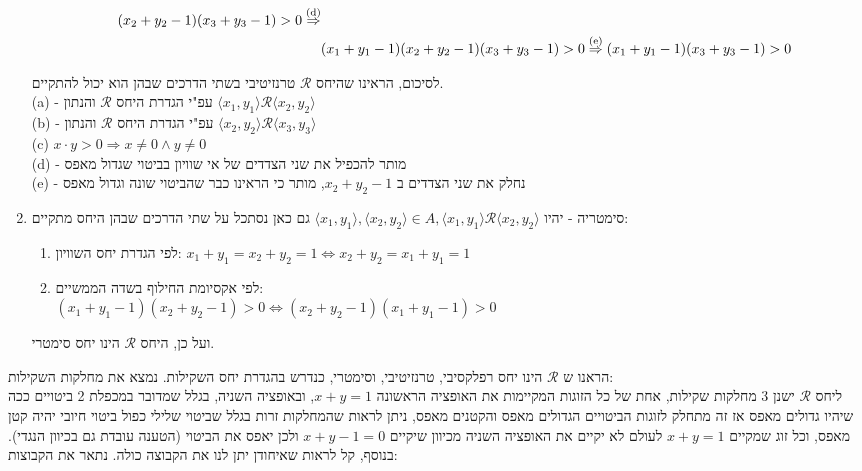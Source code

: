 \documentclass{article}
\begin{document}
\begin{enumerate}
\begin{enumerate}
\begin{align*}
				(x_2 + y_2 - 1)(x_3 + y_3 - 1) > 0 \overset{\text{(d)}}\Rightarrow \\
				&(x_1 + y_1 - 1)(x_2 + y_2 - 1)(x_3 + y_3 - 1) > 0 \overset{\text{(e)}}\Rightarrow
				(x_1 + y_1 - 1)(x_3 + y_3 - 1) > 0
			\end{align*}
		\end{enumerate}
		לסיכום, הראינו שהיחס $\mathcal{R}$ טרנזיטיבי בשתי הדרכים שבהן הוא יכול להתקיים. \\
		(a) - עפ"י הגדרת היחס $\mathcal{R}$ והנתון $\langle x_1, y_1 \rangle \mathcal{R} \langle x_2, y_2 \rangle$ \\
		(b) - עפ"י הגדרת היחס $\mathcal{R}$ והנתון $\langle x_2, y_2 \rangle \mathcal{R} \langle x_3, y_3 \rangle$ \\
		(c) $x \cdot y > 0 \Rightarrow x \neq 0 \land y \neq 0$ \\
		(d) - מותר להכפיל את שני הצדדים של אי שוויון בביטוי שגדול מאפס\\
		(e) - נחלק את שני הצדדים ב $x_2 + y_2 - 1$, מותר כי הראינו כבר שהביטוי שונה וגדול מאפס

	\item סימטריה -
	יהיו $\langle x_1, y_1 \rangle, \langle x_2, y_2 \rangle \in A,
	\langle x_1, y_1 \rangle \mathcal{R} \langle x_2, y_2 \rangle$
	גם כאן נסתכל על שתי הדרכים שבהן היחס מתקיים:
	\begin{enumerate}
		\item לפי הגדרת יחס השוויון: $x_1 + y_1 = x_2 + y_2 = 1 \iff x_2 + y_2 = x_1 + y_1 = 1$
		\item לפי אקסיומת החילוף בשדה הממשיים:  \\
		$(x_1 + y_1 - 1)(x_2 + y_2 - 1) > 0 \iff (x_2 + y_2 - 1)(x_1 + y_1 - 1) > 0$
	\end{enumerate}
	ועל כן, היחס $\mathcal{R}$ הינו יחס סימטרי.
\end{enumerate}
הראנו ש $\mathcal{R}$ הינו יחס רפלקסיבי, טרנזיטיבי, וסימטרי, כנדרש בהגדרת יחס השקילות.
נמצא את מחלקות השקילות: \\
ליחס $\mathcal{R}$ ישנן 3 מחלקות שקילות, אחת של כל הזוגות המקיימות את האופציה הראשונה $x + y = 1$,
ובאופציה השניה, בגלל שמדובר במכפלת 2 ביטויים ככה שיהיו גדולים מאפס אז זה מתחלק לזוגות הביטויים הגדולים מאפס והקטנים מאפס, ניתן לראות שהמחלקות זרות בגלל שביטוי שלילי כפול ביטוי חיובי יהיה קטן מאפס,
וכל זוג שמקיים $x + y = 1$  לעולם לא יקיים את האופציה השניה מכיוון שיקיים $x + y - 1 = 0$  ולכן יאפס את הביטוי (הטענה עובדת גם בכיוון הנגדי).
בנוסף, קל לראות  שאיחודן יתן לנו את הקבוצה כולה.
נתאר את הקבוצות:
\end{document}
